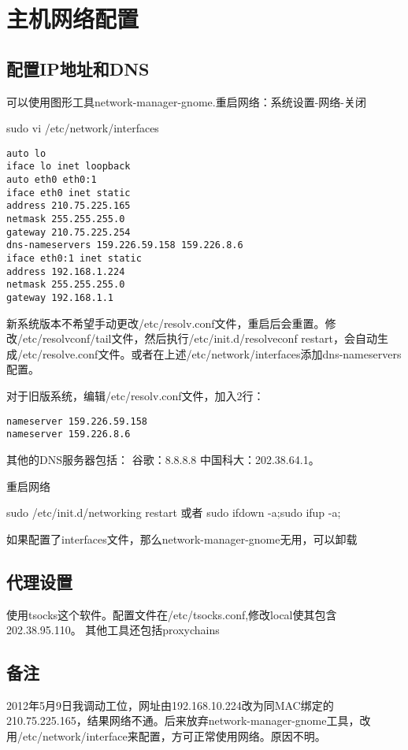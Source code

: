 \section{主机网络配置}
\subsection{配置IP地址和DNS}
可以使用图形工具network-manager-gnome.重启网络：系统设置-网络-关闭
\begin{shellcmd}
sudo vi /etc/network/interfaces 
\end{shellcmd}
\begin{verbatim}
auto lo
iface lo inet loopback
auto eth0 eth0:1
iface eth0 inet static
address 210.75.225.165
netmask 255.255.255.0
gateway 210.75.225.254
dns-nameservers 159.226.59.158 159.226.8.6
iface eth0:1 inet static
address 192.168.1.224
netmask 255.255.255.0
gateway 192.168.1.1
\end{verbatim}

新系统版本不希望手动更改/etc/resolv.conf文件，重启后会重置。修改/etc/resolvconf/tail文件，然后执行/etc/init.d/resolveconf restart，会自动生成/etc/resolve.conf文件。或者在上述/etc/network/interfaces添加dns-nameservers配置。

对于旧版系统，编辑/etc/resolv.conf文件，加入2行： 
\begin{verbatim}
nameserver 159.226.59.158
nameserver 159.226.8.6
\end{verbatim}
其他的DNS服务器包括：
谷歌：8.8.8.8
中国科大：202.38.64.1。


重启网络
\begin{shellcmd}
sudo /etc/init.d/networking restart
或者 sudo ifdown -a;sudo ifup -a;
\end{shellcmd}
如果配置了interfaces文件，那么network-manager-gnome无用，可以卸载

\subsection{代理设置}
使用tsocks这个软件。配置文件在/etc/tsocks.conf,修改local使其包含202.38.95.110。
其他工具还包括proxychains

\subsection{备注}
2012年5月9日我调动工位，网址由192.168.10.224改为同MAC绑定的210.75.225.165，结果网络不通。后来放弃network-manager-gnome工具，改用/etc/network/interface来配置，方可正常使用网络。原因不明。




